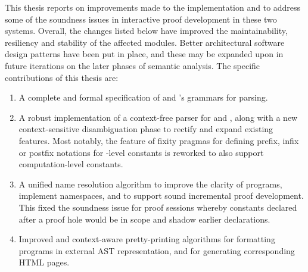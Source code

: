 

This thesis reports on improvements made to the implementation \Beluga and \Harpoon to address some of the soundness issues in interactive proof development in these two systems.
Overall, the changes listed below have improved the maintainability, resiliency and stability of the affected modules.
Better architectural software design patterns have been put in place, and these may be expanded upon in future iterations on the later phases of semantic analysis.
The specific contributions of this thesis are:
\begin{enumerate}
\item
A complete and formal specification of \Beluga and \Harpoon's grammars for parsing.
\item
A robust implementation of a context-free parser for \Beluga and \Harpoon, along with a new context-sensitive disambiguation phase to rectify and expand existing features.
Most notably, the \Beluga feature of fixity pragmas for defining prefix, infix or postfix notations for \LF-level constants is reworked to also support computation-level constants.
\item
A unified name resolution algorithm to improve the clarity of \Beluga programs, implement namespaces, and to support sound incremental proof development.
This fixed the soundness issue for \Harpoon proof sessions whereby constants declared after a proof hole would be in scope and shadow earlier declarations.
\item
Improved and context-aware pretty-printing algorithms for formatting \Beluga programs in external \ac{AST} representation, and for generating corresponding \textsc{HTML} pages.
\end{enumerate}

